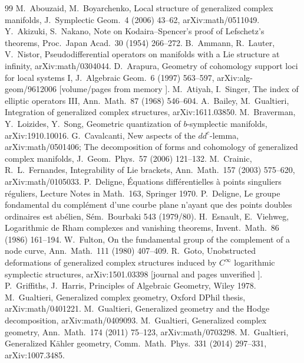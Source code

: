 \begin{thebibliography}{99}\small
{} M.\ Abouzaid, M.\ Boyarchenko, Local structure of generalized complex manifolds, J.\ Symplectic Geom.\ 4 (2006) 43--62, arXiv:math/0511049.
 Y.\ Akizuki, S.\ Nakano, Note on Kodaira--Spencer's proof of Lefschetz's theorems, Proc.\ Japan Acad.\ 30 (1954) 266--272.
 B.\ Ammann, R.\ Lauter, V.\ Nistor, Pseudodifferential operators on manifolds with a Lie structure at infinity, arXiv:math/0304044.
 D.\ Arapura, Geometry of cohomology support loci for local systems I, J.\ Algebraic Geom.\ 6 (1997) 563--597, arXiv:alg-geom/9612006 [volume/pages from memory \tQ].
 M.\ Atiyah, I.\ Singer, The index of elliptic operators III, Ann.\ Math.\ 87 (1968) 546--604.
 A.\ Bailey, M.\ Gualtieri, Integration of generalized complex structures, arXiv:1611.03850.
 M.\ Braverman, Y.\ Loizides, Y.\ Song, Geometric quantization of $b$-symplectic manifolds, arXiv:1910.10016.
 G.\ Cavalcanti, New aspects of the $dd^c$-lemma, arXiv:math/0501406; The decomposition of forms and cohomology of generalized complex manifolds, J.\ Geom.\ Phys.\ 57 (2006) 121--132.
 M.\ Crainic, R.\ L.\ Fernandes, Integrability of Lie brackets, Ann.\ Math.\ 157 (2003) 575--620, arXiv:math/0105033.
 P.\ Deligne, \'Equations diff\'erentielles \`a points singuliers r\'eguliers, Lecture Notes in Math.\ 163, Springer 1970.
 P.\ Deligne, Le groupe fondamental du compl\'ement d'une courbe plane n'ayant que des points doubles ordinaires est ab\'elien, S\'em.\ Bourbaki 543 (1979/80).
 H.\ Esnault, E.\ Viehweg, Logarithmic de Rham complexes and vanishing theorems, Invent.\ Math.\ 86 (1986) 161--194.
 W.\ Fulton, On the fundamental group of the complement of a node curve, Ann.\ Math.\ 111 (1980) 407--409.
 R.\ Goto, Unobstructed deformations of generalized complex structures induced by $C^\infty$ logarithmic symplectic structures, arXiv:1501.03398 [journal and pages unverified \tQ].
 P.\ Griffiths, J.\ Harris, Principles of Algebraic Geometry, Wiley 1978.
 M.\ Gualtieri, Generalized complex geometry, Oxford DPhil thesis, arXiv:math/0401221.
 M.\ Gualtieri, Generalized geometry and the Hodge decomposition, arXiv:math/0409093.
 M.\ Gualtieri, Generalized complex geometry, Ann.\ Math.\ 174 (2011) 75--123, arXiv:math/0703298.
 M.\ Gualtieri, Generalized K\"ahler geometry, Comm.\ Math.\ Phys.\ 331 (2014) 297--331, arXiv:1007.3485.

\end{thebibliography}
